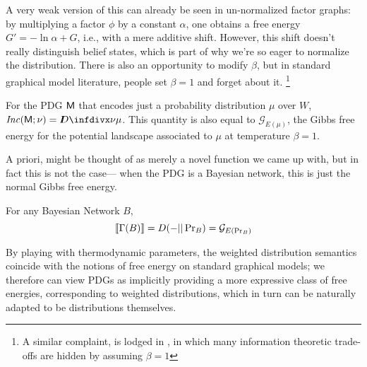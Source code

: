 \documentclass{article}
\newcommand{\sfM}{\mathsf M}
\newcommand\inconsist{\mathit{Inc}}
\newcommand{\MN}{PDG}
\newcommand{\MNs}{\MN s}
\numberwithin{equation}{section}
\begin{document}
	A very weak version of this can already be seen in un-normalized factor graphs: by multiplying a factor $\phi$ by a constant $\alpha$, one obtains a free energy $G' = - \ln \alpha + G$, i.e., with a mere additive shift. However, this shift doesn't really distinguish belief states, which is part of why we're so eager to normalize the distribution.
	There is also an opportunity to modify $\beta$, but in standard graphical model literature, people set $\beta = 1$ and forget about it.%
		\footnote{A similar complaint, is lodged in \parencite{fixing-broken-elbo}, in which many information theoretic trade-offs are hidden by assuming $\beta = 1$}


	\begin{examplex}[continues=ex:worldsonly]\label{ex:energy-from-distrib}
		For the PDG $\sf M$ that encodes just a probability distribution $\mu$ over $W$,  $\inconsist(\sfM; \nu) = \kldiv{\nu}{\mu}$. This quantity is also equal to $\mathcal G_{E(\mu)}$, the Gibbs free energy for the potential landscape associated to $\mu$ at temperature $\beta = 1$.
	\end{examplex}


	A priori,  might be thought of as merely a novel function we came up with, but in fact this is not the case--- when the PDG is a Bayesian network, this is just the normal Gibbs free energy.

	\begin{prop}\label{prop:bn-free-energy}
		For any Bayesian Network $B$, 
		\[ \llbracket\Gamma(B)\rrbracket = D(- || \Pr\nolimits_B) = \mathcal G_{E(\Pr_B)} \]
	\end{prop}
	
	By playing with thermodynamic parameters, the weighted distribution semantics coincide with the notions of free energy on standard graphical models; we therefore can view PDGs as implicitly providing a more expressive class of free energies, corresponding to weighted distributions, which in turn can be naturally adapted to be distributions themselves.
	


\end{document}

